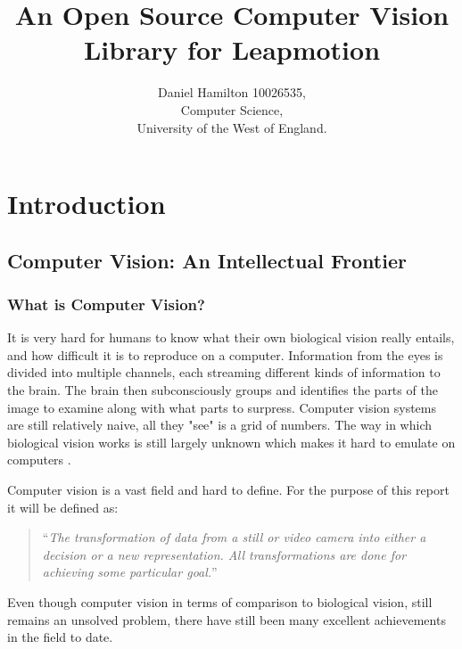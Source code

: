 \documentclass[12pt,a4paper]{report}
\title{An Open Source Computer Vision Library for Leapmotion}
\author{Daniel Hamilton 10026535,\\Computer Science,\\University of the West of England.}
\begin{document}
	\maketitle
	\tableofcontents
	\begin{abstract}
	
	\end{abstract}	
	\chapter{Introduction}
		\section{Computer Vision: An Intellectual Frontier}
			\subsection{What is Computer Vision?}		
				
				It is very hard for humans to know what their own biological vision really entails, and how difficult it is to reproduce on a computer.
				Information from the eyes is divided into multiple channels, each streaming different kinds of information to the brain.
				The brain then subconsciously groups and identifies the parts of the image to examine along with what parts to surpress.
				Computer vision systems are still relatively naive, all they "see" is a grid of numbers.
				The way in which biological vision works is still largely unknown which makes it hard to emulate on computers \cite{cvMultipleViewGeometry}.
				
				Computer vision is a vast field and hard to define.
				For the purpose of this report it will be defined as:
	
				\begin{quote}
					``\textit{The transformation of data from a still or video camera into either a decision or a new representation.
						All transformations are done for achieving some particular goal.}'' \cite{cvDef}
				\end{quote}
				
				Even though computer vision in terms of comparison to biological vision, still remains an unsolved problem, there have still been many excellent achievements in the field to date.
\end{document}
